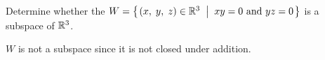 

\begin{Exercise}[
name={},
title={}, 
difficulty=0,
origin={\cite{BS}}]
Determine whether the $W = \mbox{$\left\{\hspace{0.1em}(x,\; y,\; z) \in \mathbb{R}^3 \;\;\middle|\;\; xy = 0\text{ and }yz = 0\hspace{0.1em}\right\}$}$ is a subspace of $\mathbb{R}^3$.
\end{Exercise}

\begin{Answer}
$W$ is not a subspace since it is not closed under addition.
\end{Answer}
